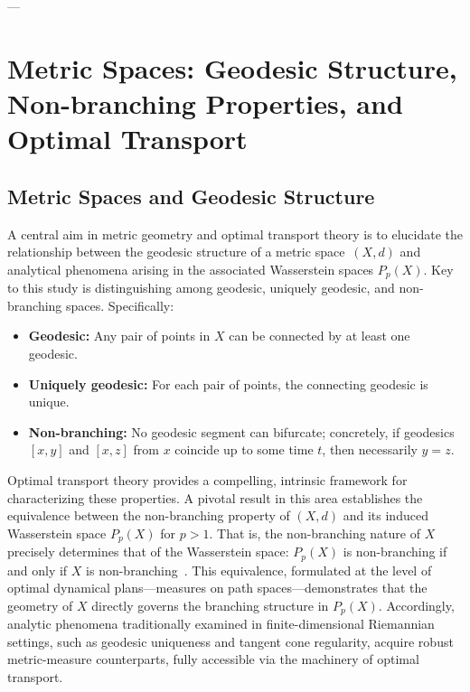 \documentclass[11pt]{article}
\begin{document}
---
\section{Metric Spaces: Geodesic Structure, Non-branching Properties, and Optimal Transport}

\subsection{Metric Spaces and Geodesic Structure}

A central aim in metric geometry and optimal transport theory is to elucidate the relationship between the geodesic structure of a metric space~$(X, d)$ and analytical phenomena arising in the associated Wasserstein spaces $P_p(X)$. Key to this study is distinguishing among geodesic, uniquely geodesic, and non-branching spaces. Specifically:

\begin{itemize}
    \item \textbf{Geodesic:} Any pair of points in $X$ can be connected by at least one geodesic.
    \item \textbf{Uniquely geodesic:} For each pair of points, the connecting geodesic is unique.
    \item \textbf{Non-branching:} No geodesic segment can bifurcate; concretely, if geodesics $[x, y]$ and $[x, z]$ from $x$ coincide up to some time $t$, then necessarily $y = z$.
\end{itemize}

Optimal transport theory provides a compelling, intrinsic framework for characterizing these properties. A pivotal result in this area establishes the equivalence between the non-branching property of $(X, d)$ and its induced Wasserstein space $P_p(X)$ for $p > 1$. That is, the non-branching nature of $X$ precisely determines that of the Wasserstein space: $P_p(X)$ is non-branching if and only if $X$ is non-branching~\cite{ref107}. This equivalence, formulated at the level of optimal dynamical plans—measures on path spaces—demonstrates that the geometry of $X$ directly governs the branching structure in $P_p(X)$. Accordingly, analytic phenomena traditionally examined in finite-dimensional Riemannian settings, such as geodesic uniqueness and tangent cone regularity, acquire robust metric-measure counterparts, fully accessible via the machinery of optimal transport.
\end{document}

